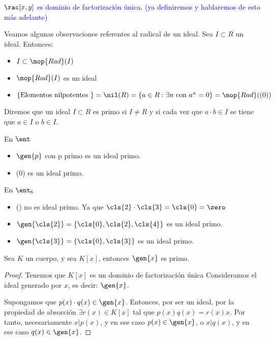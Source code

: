 \textcolor{blue}{\obs $\rac[x,y]$ es dominio de factorización única. (ya definiremos y hablaremos de esto más adelante)}

Veamos algunas observaciones referentes al radical de un ideal. Sea $I \subset R$ un ideal. Entonces:
\begin{itemize}
	\item $I \subset \mop{Rad}(I)$
	\item $\mop{Rad}(I)$ es un ideal
	\item $\{\text{Elementos nilpotentes }\}=\nil(R)=\{a\in R: \exists n \text{ con }a^n=0 \}=\mop{Rad}((0))$
\end{itemize}

\begin{defn} \label{def:IdealPrimo}
	Diremos que un ideal $I\subset R$ es primo si $I\neq R$ y si cada vez que $a\cdot b \in I$ se tiene que $a\in I$ o $b\in I$.
\end{defn}

\begin{example} En $\ent$
	\begin{itemize}
		\item $\gen{p}$ con p primo es un ideal primo.
		\item (0) es un ideal primo.
	\end{itemize}
\end{example}

\begin{example} En $\ent_6$
	\begin{itemize}
		\item (\zero) no es ideal primo. Ya que $\cls{2} \cdot \cls{3}=\cls{0}=\zero$
		\item $\gen{\cls{2}}=\{\cls{0},\cls{2},\cls{4} \}$ es un ideal primo.
		\item $\gen{\cls{3}}=\{\cls{0},\cls{3} \}$ es un ideal primo.
	\end{itemize}
\end{example}

\begin{prop}
	Sea $K$ un cuerpo, y sea $K[x]$, entonces $\gen{x}$ es primo.
\end{prop}
\begin{proof}
	Tenemos que $K[x]$ es un dominio de factorización única  Consideramos el ideal generado por $x$, es decir: $\gen{x}$.


	Supongamos que $p(x)\cdot q(x) \in \gen{x}$. Entonces, por ser un ideal, por la propiedad de absorción $\exists r(x) \in K[x]$ tal que $p(x) q(x)=r(x) x$. Por tanto, necesariamente $x|p(x)$, y en ese caso $p(x) \in \gen{x}$, o $x|q(x)$, y en ese caso $q(x) \in \gen{x}$.
\end{proof}

